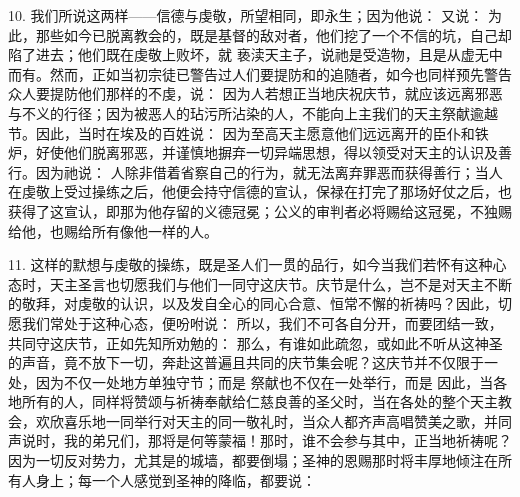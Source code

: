 10. 我们所说这两样——信德与虔敬，所望相同，即永生；因为他说： 又说： 为此，那些如今已脱离教会的，既是基督的敌对者，他们挖了一个不信的坑，自己却陷了进去；他们既在虔敬上败坏，就 亵渎天主子，说祂是受造物，且是从虚无中而有。然而，正如当初宗徒已警告过人们要提防和的追随者，如今也同样预先警告众人要提防他们那样的不虔，说： 因为人若想正当地庆祝庆节，就应该远离邪恶与不义的行径；因为被恶人的玷污所沾染的人，不能向上主我们的天主祭献逾越节。因此，当时在埃及的百姓说： 因为至高天主愿意他们远远离开的臣仆和铁炉，好使他们脱离邪恶，并谨慎地摒弃一切异端思想，得以领受对天主的认识及善行。因为祂说： 人除非借着省察自己的行为，就无法离弃罪恶而获得善行；当人在虔敬上受过操练之后，他便会持守信德的宣认，保禄在打完了那场好仗之后，也获得了这宣认，即那为他存留的义德冠冕；公义的审判者必将赐给这冠冕，不独赐给他，也赐给所有像他一样的人。\par

11. 这样的默想与虔敬的操练，既是圣人们一贯的品行，如今当我们若怀有这种心态时，天主圣言也切愿我们与他们一同守这庆节。庆节是什么，岂不是对天主不断的敬拜，对虔敬的认识，以及发自全心的同心合意、恒常不懈的祈祷吗？因此，切愿我们常处于这种心态，便吩咐说： 所以，我们不可各自分开，而要团结一致，共同守这庆节，正如先知所劝勉的： 那么，有谁如此疏忽，或如此不听从这神圣的声音，竟不放下一切，奔赴这普遍且共同的庆节集会呢？这庆节并不仅限于一处，因为不仅一处地方单独守节；而是 祭献也不仅在一处举行，而是 因此，当各地所有的人，同样将赞颂与祈祷奉献给仁慈良善的圣父时，当在各处的整个天主教会，欢欣喜乐地一同举行对天主的同一敬礼时，当众人都齐声高唱赞美之歌，并同声说时，我的弟兄们，那将是何等蒙福！那时，谁不会参与其中，正当地祈祷呢？因为一切反对势力，尤其是的城墙，都要倒塌；圣神的恩赐那时将丰厚地倾注在所有人身上；每一个人感觉到圣神的降临，都要说：\par

